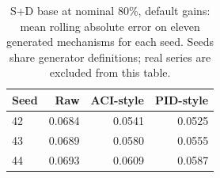 \begin{table}[htbp]\centering\footnotesize
\caption{S+D base at nominal 80\%, default gains: mean rolling absolute error on eleven generated mechanisms for each seed. Seeds share generator definitions; real series are excluded from this table.}
\begin{tabular}{lrrr}
\toprule
Seed & Raw & ACI-style & PID-style\\\midrule
42 & 0.0684 & 0.0541 & 0.0525\\
43 & 0.0689 & 0.0580 & 0.0555\\
44 & 0.0693 & 0.0609 & 0.0587\\
\bottomrule\end{tabular}\end{table}
